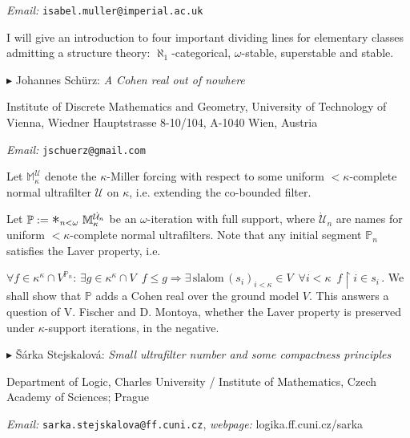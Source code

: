 \documentclass[a4paper]{amsart}
\theoremstyle{remark}
\renewcommand{\restriction}{\mathbin\upharpoonright}
\newcommand{\vsp}{\vspace{20pt}}
\begin{document}
\noindent 
\emph{Email:} \texttt{isabel.muller@imperial.ac.uk}

I will give an introduction to four important dividing lines for elementary classes admitting a structure theory: $\aleph_1$-categorical, $\omega$-stable, superstable and stable. 








\vsp 

\noindent 
$\blacktriangleright$ Johannes Sch\"urz: \emph{A Cohen real out of nowhere} 

\noindent 
Institute of Discrete Mathematics and Geometry, 
University of Technology of Vienna, 
Wiedner Hauptstrasse 8-10/104, 
A-1040 Wien, 
Austria 

\noindent 
\emph{Email:} \texttt{jschuerz@gmail.com}

Let $\mathbb{M}_\kappa ^{\mathcal{U}}$ denote the $\kappa$-Miller forcing with respect to some uniform ${<} \kappa$-complete normal ultrafilter $\mathcal{U}$ on $\kappa$, i.e. extending the co-bounded filter. 

Let $\mathbb{P}:= \mathlarger{\mathlarger{\mathlarger{*}}} _{n < \omega} \,\, \mathbb{M}_\kappa ^{\dot{\mathcal{U}}_n}$ be an $\omega$-iteration with full support, where $\dot{\mathcal{U}}_n$ are names for uniform ${<} \kappa$-complete normal ultrafilters. Note that any initial segment $\mathbb{P}_n$ satisfies the Laver property, i.e. 

$\forall f \in \kappa^{\kappa} \cap V^{\mathbb{P}_n}\colon \, \exists g \in \kappa^{\kappa} \cap V \,\,\,  f \leq g \Rightarrow \exists \, \text{slalom} \, (s_i)_{i < \kappa} \in V \,\,\, \forall i < \kappa \,\,\, f \restriction i \in s_i \, .$
 We shall show that $\mathbb{P}$ adds a Cohen real over the ground model $V$. This answers a question of V. Fischer and D. Montoya, whether the Laver property is preserved under $\kappa$-support iterations, in the negative.\\








\vsp 

\noindent 
$\blacktriangleright$ \v{S}\'{a}rka Stejskalov\'{a}: \emph{Small ultrafilter number and some compactness principles} 

\noindent 
Department of Logic, Charles University  / Institute of Mathematics, Czech Academy of Sciences; Prague

\noindent 
\emph{Email:} \texttt{sarka.stejskalova@ff.cuni.cz}, \emph{webpage:} logika.ff.cuni.cz/sarka 
\end{document}
